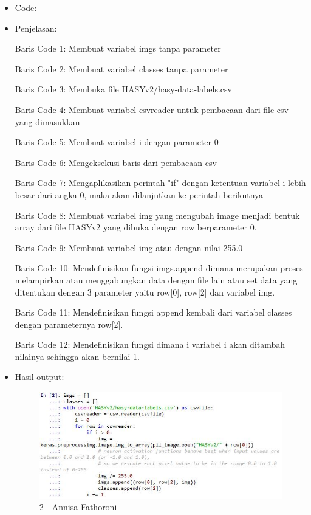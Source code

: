 \begin{itemize}
\item Code:


\item Penjelasan:

Baris Code 1: Membuat variabel imgs tanpa parameter

Baris Code 2: Membuat variabel classes tanpa parameter

Baris Code 3: Membuka file HASYv2/hasy-data-labels.csv

Baris Code 4: Membuat variabel csvreader untuk pembacaan dari file csv yang dimasukkan

Baris Code 5: Membuat variabel i dengan parameter 0

Baris Code 6: Mengeksekusi baris dari pembacaan csv 

Baris Code 7: Mengaplikasikan perintah "if" dengan ketentuan variabel i lebih besar dari angka 0, maka akan dilanjutkan ke perintah berikutnya

Baris Code 8: Membuat variabel img yang mengubah image menjadi bentuk array dari file HASYv2 yang dibuka dengan row berparameter 0.

Baris Code 9: Membuat variabel img atau dengan nilai 255.0

Baris Code 10: Mendefinisikan fungsi imgs.append dimana merupakan proses melampirkan atau menggabungkan data dengan file lain atau set data yang ditentukan dengan 3 parameter yaitu row[0], row[2] dan variabel img.

Baris Code 11: Mendefinisikan fungsi append kembali dari variabel classes dengan parameternya row[2].

Baris Code 12: Mendefinisikan fungsi dimana i variabel i akan ditambah nilainya sehingga akan bernilai 1.

\item Hasil output:

\begin{figure}[!hbtp]
\centering
\includegraphics[scale=0.7]{figures/Chapter 7/1164067/Praktek/Chapter7AnnisaFathoroni2.jpg}
\caption{2 - Annisa Fathoroni}
\label{2 - Annisa Fathoroni}
\end{figure}

\end{itemize}

